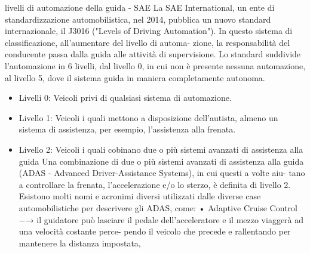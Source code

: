 \documentclass[14pt]{extarticle}
\begin{document}
livelli di automazione della guida - SAE
La SAE International, un ente di standardizzazione automobilistica,  nel 2014, pubblica un nuovo standard internazionale, il J3016 ("Levels of Driving Automation").
In questo sistema di classificazione, all’aumentare del livello di automa-
zione, la responsabilità del conducente passa dalla guida alle attività di
supervisione.
Lo standard suddivide l'automazione in 6 livelli, dal livello 0, in cui non è presente nessuna  automazione, al livello 5, dove il sistema guida in maniera completamente autonoma.
\begin{itemize}
\item Livelli 0:
Veicoli privi di qualsiasi sistema di automazione.
\item Livello 1: 
Veicoli  i quali mettono a disposizione dell'autista, almeno un sistema di assistenza, per esempio, l'assistenza alla frenata.
\item Livello 2:
Veicoli i quali cobinano due o più sistemi avanzati di assistenza alla guida
Una combinazione di due o più sistemi avanzati di assistenza alla guida
(ADAS - Advanced Driver-Assistance Systems), in cui questi a volte aiu-
tano a controllare la frenata, l’accelerazione e/o lo sterzo, è definita di
livello 2. Esistono molti nomi e acronimi diversi utilizzati dalle diverse
case automobilistiche per descrivere gli ADAS, come:
• Adaptive Cruise Control −→ il guidatore può lasciare il pedale
dell’acceleratore e il mezzo viaggerà ad una velocità costante perce-
pendo il veicolo che precede e rallentando per mantenere la distanza
impostata,


\end{itemize}
\end{document}
